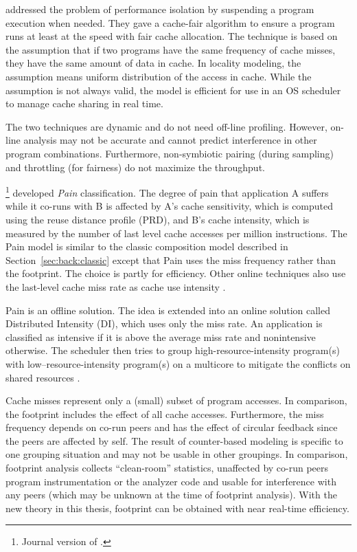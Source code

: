 
\citet{Fedorova+:PACT07} addressed the problem of performance
isolation by suspending a program execution when needed.  They gave a
cache-fair algorithm to ensure a program runs at least at the speed
with fair cache allocation.  The technique is based on the assumption
that if two programs have the same frequency of cache misses, they
have the same amount of data in cache.  In locality modeling, the
assumption means uniform distribution of the access in cache.  While
the assumption is not always valid, the model is efficient for use in
an OS scheduler to manage cache sharing in real time.

The two techniques are dynamic and do not need off-line profiling.
However, on-line analysis may not be accurate and cannot predict
interference in other program combinations. Furthermore, non-symbiotic
pairing (during sampling) and throttling (for fairness) do not
maximize the throughput.


\citet{Blagodurov+:TOCS10}\footnote{Journal version of
  \citep{Zhuravlev+:ASPLOS10,Fedorova+:CACM10}.} developed \emph{Pain}
classification.  The degree of pain that application A suffers while
it co-runs with B is affected by A's cache sensitivity, which is
computed using the reuse distance profile (PRD), and B's cache
intensity, which is measured by the number of last level cache
accesses per million instructions.  The Pain model is similar to the
classic composition model described in Section~\ref{sec:back:classic}
except that Pain uses the miss frequency rather than the footprint.
The choice is partly for efficiency.  Other online techniques also use
the last-level cache miss rate as cache use intensity
\citep{Shen:ASPLOS10,knauerhase2008micro}. 

Pain is an offline solution.  The idea is extended into an online
solution called Distributed Intensity (DI), which uses only the miss
rate.  An application is classified as intensive if it is above the
average miss rate and nonintensive otherwise.  The scheduler then
tries to group high-resource-intensity program(s) with
low--resource-intensity program(s) on a multicore to mitigate the
conflicts on shared resources \citep{Blagodurov+:TOCS10,Zhuravlev+:ASPLOS10,Fedorova+:CACM10}.

Cache misses represent only a (small) subset of program accesses.  In
comparison, the footprint includes the effect of all cache accesses.
Furthermore, the miss frequency depends on co-run peers and has the
effect of circular feedback since the peers are affected by self.  The
result of counter-based modeling is specific to one grouping situation
and may not be usable in other groupings.  In comparison, footprint
analysis collects ``clean-room'' statistics, unaffected by co-run
peers program instrumentation or the analyzer code
and usable for interference with any peers (which may be
unknown at the time of footprint analysis).  With the new theory in
this thesis, footprint can be obtained with near real-time efficiency.

